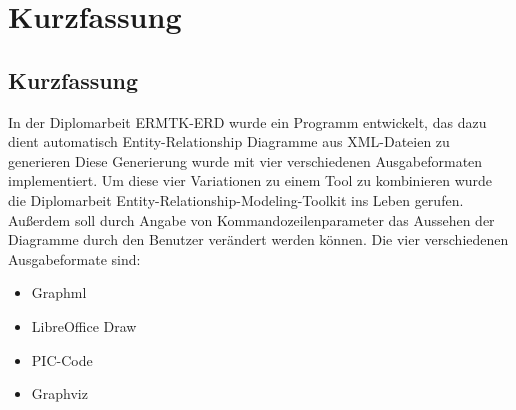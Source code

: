 \part{Kurzfassung}

\chapter{Kurzfassung}
\label{cha:Kurzfassung }

\noindent
In der Diplomarbeit ERMTK-ERD wurde ein Programm entwickelt, das dazu dient automatisch Entity-Relationship Diagramme aus XML-Dateien zu generieren
Diese Generierung wurde mit vier verschiedenen Ausgabeformaten implementiert. Um diese vier Variationen zu einem Tool zu kombinieren wurde die Diplomarbeit Entity-Relationship-Modeling-Toolkit ins Leben gerufen. Außerdem soll durch Angabe von Kommandozeilenparameter das Aussehen der Diagramme durch den Benutzer verändert werden können. Die vier verschiedenen Ausgabeformate sind:
\begin{itemize}
	\item Graphml
	\item LibreOffice Draw
	\item PIC-Code
	\item Graphviz
\end{itemize}   